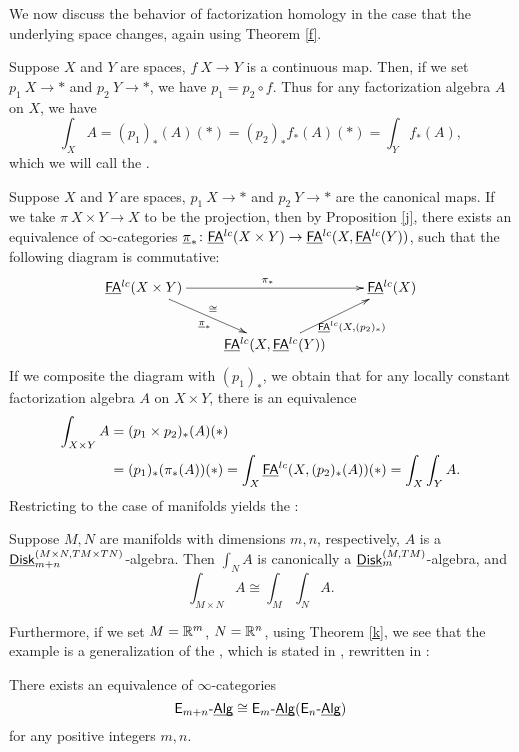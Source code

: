 \documentclass[twoside]{article}
\begin{document}
We now discuss the behavior of factorization homology in the case that
the underlying space changes, again using Theorem \ref{f}.

\begin{example}
    Suppose $X$ and $Y$ are spaces, $f\:X\to Y$ is a continuous map. Then, if we set
    $p_1\:X\to *$ and $p_2\:Y\to *$, we have $p_1=p_2\circ f$.
    Thus for any factorization algebra $A$ on $X$, we have $$\int_XA=(p_1)_*(A)(*)
    =(p_2)_*f_*(A)(*)=\int_Yf_*(A),$$ which we will call the .
\end{example}

\begin{example}\label{u}
    Suppose $X$ and $Y$ are spaces, $p_1\:X\to *$ and $p_2\:Y\to *$ are the canonical
    maps. If we take $\pi\:X\times Y\to X$ to be the projection, then by Proposition
    \ref{j}, there exists an equivalence of $\infty$-categories $\underline\pi_*\colon
    \underline{\smash{\mathsf{FA}}}^{lc}(X\times Y)\to\underline{\smash{\mathsf{FA}}}^{lc}(X,\underline{\smash{\mathsf{FA}}}^{lc}(Y))$, such that the following
    diagram is commutative: $$\xymatrix{\FA^{lc}(X\times Y)\ar[rr]^{\pi_*}\ar[rd]
    _{\underline\pi_*}^{\cong}&&\FA^{lc}(X)\\&\FA^{lc}(X,\FA^{lc}(Y))\ar[ru]
    _{\FA^{lc}(X,(p_2)_*)}}$$ If we composite the diagram with $(p_1)_*$, 
    we obtain that for any locally constant factorization algebra $A$ on $X\times Y$, there is
    an equivalence $$\begin{aligned}\int_{X\times Y}A&=(p_1\times p_2)_*(A)(*)
    \\&=(p_1)_*(\pi_*(A))(*)
    =\int_X\underline{\smash{\mathsf{FA}}}^{lc}(X,(p_2)_*(A))(*)=\int_X\int_YA.\end{aligned}$$ Restricting to the case
    of manifolds yields the :

    \begin{proposition}
        Suppose $M,N$ are manifolds with dimensions $m,n$, respectively, $A$
        is a $\underline{\smash{\mathsf{Disk}}}_{m+n}^{(M\times N,TM\times TN)}$-algebra. Then $\int_NA$
        is canonically a $\underline{\smash{\mathsf{Disk}}}_m^{(M,TM)}$-algebra, and $$\int_{M\times N}A
        \cong\int_M\int_NA.$$
    \end{proposition}

    Furthermore, if we set $M=\mathbb{R}^m$, $N=\mathbb{R}^n$, using Theorem \ref{k}, we see that
    the example is a generalization of the , which is stated
    in \cite{Dun88}, rewritten in \cite{Lur16}:

    \begin{theorem}\label{v}
        There exists an equivalence of $\infty$-categories $$\mathsf{E}_{m+n}\text{-}\underline{\smash{\mathsf{Alg}}}\cong
        \mathsf{E}_m\text{-}\underline{\smash{\mathsf{Alg}}}(\mathsf{E}_n\text{-}\underline{\smash{\mathsf{Alg}}})$$ for any positive integers $m,n$.
    \end{theorem}
\end{example}
\end{document}
